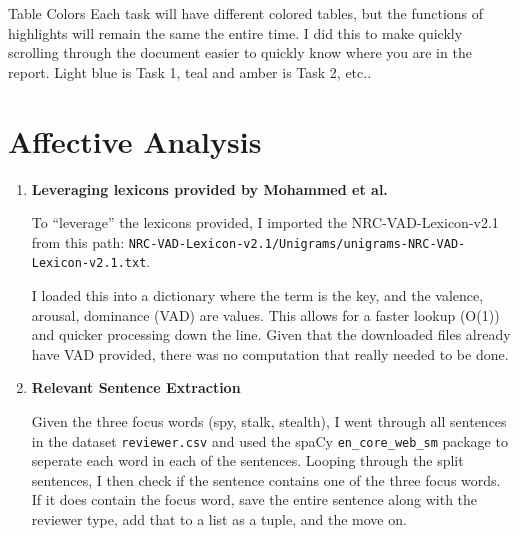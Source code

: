 \documentclass[12pt]{article}
\begin{document}
\maketitlepage

\tableofcontents

\begin{important}{Table Colors}
    Each task will have different colored tables, but the functions of highlights will remain the 
    same the entire time. I did this to make quickly scrolling through the document easier to 
    quickly know where you are in the report. Light blue is Task 1, teal and amber is Task 2, etc..
\end{important}

\section{Affective Analysis}

\begin{enumerate}
    \item \textbf{Leveraging lexicons provided by Mohammed et al.}
    
    To ``leverage'' the lexicons provided, I imported the NRC-VAD-Lexicon-v2.1 from 
    this path: \texttt{NRC-VAD-Lexicon-v2.1/Unigrams/unigrams-NRC-VAD-Lexicon-v2.1.txt}. 
    
    I loaded this into a dictionary where the term is the key, and the valence, arousal, dominance (VAD) are values. 
    This allows for a faster lookup (O(1)) and quicker processing down the line. Given that the 
    downloaded files already have VAD provided, there was no computation that 
    really needed to be done.

    \item \textbf{Relevant Sentence Extraction}
    
    Given the three focus words (spy, stalk, stealth), I went through all sentences in the dataset
    \texttt{reviewer.csv} and used the spaCy \texttt{en\_core\_web\_sm} package to seperate each word in each of the sentences. 
    Looping through the split sentences, I then check if the sentence contains one of the three focus words. 
    If it does contain the focus word, save the entire sentence along with the reviewer type, add that to a list 
    as a tuple, and the move on. 


\end{enumerate}
\end{document}
